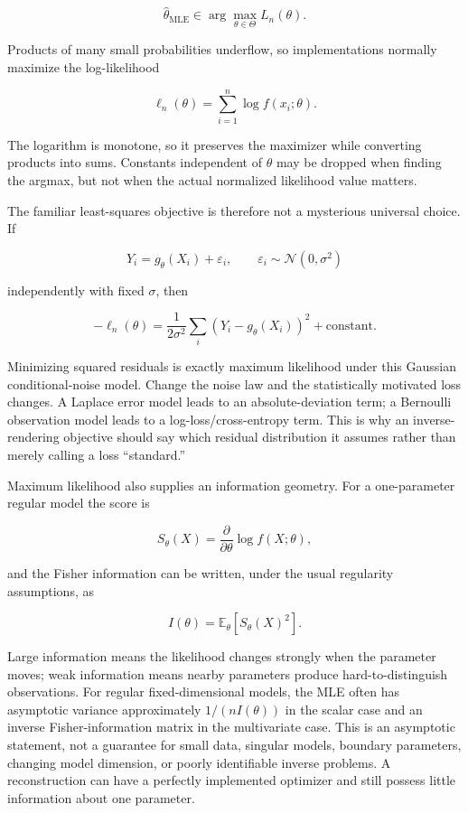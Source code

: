 \[
\hat\theta_{\mathrm{MLE}}\in\arg\max_{\theta\in\Theta}L_n(\theta).
\]

Products of many small probabilities underflow, so implementations normally maximize the log-likelihood

\[
\ell_n(\theta)=\sum_{i=1}^{n}\log f(x_i;\theta).
\]

The logarithm is monotone, so it preserves the maximizer while converting products into sums. Constants independent of \(\theta\) may be dropped when finding the argmax, but not when the actual normalized likelihood value matters.

The familiar least-squares objective is therefore not a mysterious universal choice. If

\[
Y_i=g_\theta(X_i)+\varepsilon_i,\qquad
\varepsilon_i\sim\mathcal N(0,\sigma^2)
\]

independently with fixed \(\sigma\), then

\[
-\ell_n(\theta)
=
\frac{1}{2\sigma^2}\sum_i
\left(Y_i-g_\theta(X_i)\right)^2
+\text{constant}.
\]

Minimizing squared residuals is exactly maximum likelihood under this Gaussian conditional-noise model. Change the noise law and the statistically motivated loss changes. A Laplace error model leads to an absolute-deviation term; a Bernoulli observation model leads to a log-loss/cross-entropy term. This is why an inverse-rendering objective should say which residual distribution it assumes rather than merely calling a loss ``standard.''

Maximum likelihood also supplies an information geometry. For a one-parameter regular model the score is

\[
S_\theta(X)=\frac{\partial}{\partial\theta}\log f(X;\theta),
\]

and the Fisher information can be written, under the usual regularity assumptions, as

\[
I(\theta)=
\mathbb E_\theta[S_\theta(X)^2].
\]

Large information means the likelihood changes strongly when the parameter moves; weak information means nearby parameters produce hard-to-distinguish observations. For regular fixed-dimensional models, the MLE often has asymptotic variance approximately \(1/(nI(\theta))\) in the scalar case and an inverse Fisher-information matrix in the multivariate case. This is an asymptotic statement, not a guarantee for small data, singular models, boundary parameters, changing model dimension, or poorly identifiable inverse problems. A reconstruction can have a perfectly implemented optimizer and still possess little information about one parameter.


